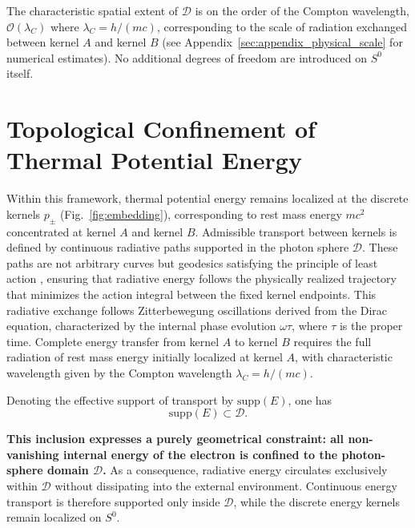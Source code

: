 \documentclass[%
 reprint,
 amsmath,amssymb,
 aps,
 prb,
]{revtex4-2}
\numberwithin{equation}{section}
\begin{document}
The characteristic spatial extent of $\mathcal{D}$ is on the order of the Compton wavelength, $\mathcal{O}(\lambda_C)$ where $\lambda_C = h/(mc)$, corresponding to the scale of radiation exchanged between kernel $A$ and kernel $B$ (see Appendix~\ref{sec:appendix_physical_scale} for numerical estimates).
No additional degrees of freedom are introduced on $S^{0}$ itself.

\section{Topological Confinement of Thermal Potential Energy}
\label{sec:confinement}

Within this framework, thermal potential energy remains localized at the discrete kernels $p_{\pm}$ (Fig.~\ref{fig:embedding}), corresponding to rest mass energy $mc^2$ concentrated at kernel $A$ and kernel $B$.
Admissible transport between kernels is defined by continuous radiative paths supported in the photon sphere $\mathcal{D}$.
These paths are not arbitrary curves but geodesics satisfying the principle of least action \cite{hanamura17765336}, ensuring that radiative energy follows the physically realized trajectory that minimizes the action integral between the fixed kernel endpoints.
This radiative exchange follows Zitterbewegung oscillations derived from the Dirac equation, characterized by the internal phase evolution $\omega\tau$, where $\tau$ is the proper time.
Complete energy transfer from kernel $A$ to kernel $B$ requires the full radiation of rest mass energy initially localized at kernel $A$, with characteristic wavelength given by the Compton wavelength $\lambda_C = h/(mc)$.

Denoting the effective support of transport by $\mathrm{supp}(E)$, one has
\begin{equation}
\mathrm{supp}(E) \subset \mathcal{D}.
\end{equation}

\textbf{This inclusion expresses a purely geometrical constraint: all non-vanishing internal energy of the electron is confined to the photon-sphere domain $\mathcal{D}$.}
As a consequence, radiative energy circulates exclusively within $\mathcal{D}$ without dissipating into the external environment.
Continuous energy transport is therefore supported only inside $\mathcal{D}$, while the discrete energy kernels remain localized on $S^{0}$.
\end{document}
